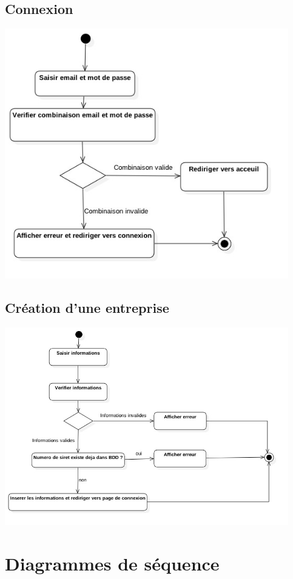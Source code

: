 \documentclass{article}
\begin{document}
\subsection{Connexion}
\begin{center}
  \includegraphics[width=350pt]{diagram/activiteConnexion}
\end{center}
\subsection{Création d'une entreprise}
\begin{center}
  \includegraphics[width=350pt]{diagram/activiteCreerEntreprise}
\end{center}


\section{Diagrammes de séquence}
\end{document}

